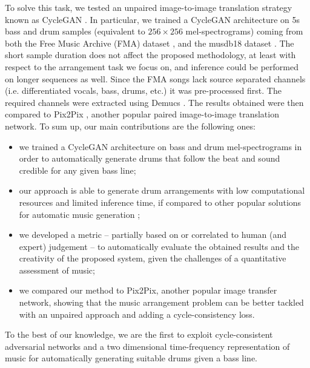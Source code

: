 \documentclass[journal]{IEEEtran}
\begin{document}
To solve this task, we tested an unpaired image-to-image translation strategy known as CycleGAN \cite{zhu2017unpaired}. 
In particular, we trained a CycleGAN architecture on 5s bass and drum samples (equivalent to $256\times256$ mel-spectrograms) coming from both the Free Music Archive (FMA) dataset \cite{fma_challenge}, and the musdb18 dataset \cite{musdb18}. The short sample duration does not affect the proposed methodology, at least with respect to the arrangement task we focus on, and inference could be performed on longer sequences as well. Since the FMA songs lack source separated channels (i.e. differentiated vocals, bass, drums, etc.) it was pre-processed first. The required channels were extracted using Demucs \cite{defossez2019demucs}. The results obtained were then compared to Pix2Pix \cite{isola2017image}, another popular paired image-to-image translation network. To sum up, our main contributions are the following ones: 
\begin{itemize}
\item we trained a CycleGAN architecture on bass and drum mel-spectrograms in order to automatically generate drums that follow the beat and sound credible for any given bass line;
\item our approach is able to generate drum arrangements with low computational resources and limited inference time, if compared to other popular solutions for automatic music generation \cite{dhariwal2020jukebox};
\item we developed a metric -- partially based on or correlated to human (and expert) judgement -- to automatically evaluate the obtained results and the creativity of the proposed system, given the challenges of a quantitative assessment of music;
\item we compared our method to Pix2Pix, another popular image transfer network, showing that the music arrangement problem can be better tackled with an unpaired approach and adding a cycle-consistency loss.
\end{itemize}
To the best of our knowledge, we are the first to exploit cycle-consistent adversarial networks and a two dimensional time-frequency representation of music for automatically generating suitable drums given a bass line. 
\end{document}
